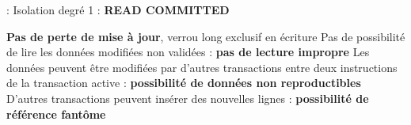 \documentclass[10pt]{beamer}
\begin{document}

\begin{frame}{\secname : \subsecname}
    Isolation degré 1 : \textbf{READ COMMITTED} \\
    \begin{itemize}
        \pro \textbf{Pas de perte de mise à jour}, verrou long exclusif en écriture
        \pro Pas de  possibilité de lire les données modifiées non validées : \textbf{pas de lecture impropre}
        \con Les données peuvent être modifiées par d'autres transactions entre deux instructions de la transaction active : \textbf{possibilité de données non reproductibles}
        \con D'autres transactions peuvent insérer des nouvelles lignes : \textbf{possibilité de référence fantôme}
    \end{itemize}
\end{frame}
\end{document}
